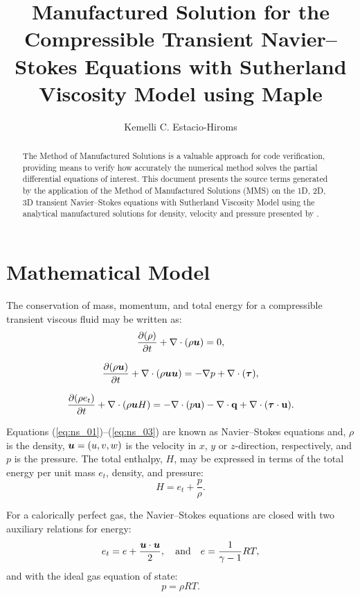 \documentclass[10pt]{article}
\title{Manufactured Solution for the Compressible Transient Navier--Stokes Equations  with Sutherland Viscosity Model using Maple}
\author{Kemelli C. Estacio-Hiroms}
\newcommand{\Diff}[2] {\dfrac{\partial( #1)}{\partial #2}}
\newcommand{\bv}[1]{\ensuremath{\mbox{\boldmath$ #1 $}}}
\begin{document}
\maketitle

\begin{abstract}
The Method of Manufactured Solutions is a valuable approach for code verification, providing means to verify how accurately the numerical method solves the partial differential equations of interest.
This document presents the source terms generated by the application of the Method of Manufactured Solutions (MMS) on the 1D, 2D, 3D transient Navier--Stokes equations  with Sutherland Viscosity Model using the analytical manufactured solutions for density, velocity and pressure presented by \citet{Roy2002}.
\end{abstract}





\section{Mathematical Model}
The conservation of mass, momentum, and total energy for a compressible transient viscous fluid may be written as:
\begin{equation}
 \label{eq:ns_01}
\Diff{\rho}{t} +\nabla \cdot \left(\rho \bv{u}\right) = 0,
\end{equation}

\begin{equation}
 \label{eq:ns_02}
\Diff{\rho \bv{u}}{t} +\nabla\cdot\left(\rho\bv{u}\bv{u}\right) = -\nabla p+  \nabla \cdot (\bv{\tau} ),
\end{equation}

\begin{equation}
 \label{eq:ns_03}
\Diff{\rho e_t}{t} +\nabla\cdot\left(\rho \bv{u} H\right) =-   \nabla\cdot(p  \mathbf{u}) -\nabla\cdot \mathbf{q} +  \nabla \cdot (\bv{\tau} \cdot \mathbf{u}).
\end{equation}


Equations (\ref{eq:ns_01})--(\ref{eq:ns_03}) are known as Navier--Stokes equations and, $\rho$ is the density, $\bv{u}=(u,v,w)$ is the velocity in $x$, $y$ or $z$-direction, respectively,    and $p$ is the pressure. The total enthalpy, $H$, may be expressed in terms of the total energy per unit mass $e_t$, density, and pressure:
$$H = e_t + \dfrac{p}{\rho}.$$

For a calorically perfect gas, the Navier--Stokes equations are closed with two auxiliary relations for energy:
\begin{equation}
 \label{eq:ns_04}
e_t= e+\dfrac{\bv{u}\cdot \bv{u}}{2},\quad\mbox{and}\quad e=\dfrac{1}{\gamma -1}RT ,
\end{equation}
and with the ideal gas equation of state:
\begin{equation}
 \label{eq:ns_05}
p=\rho RT.
\end{equation}
\end{document}

